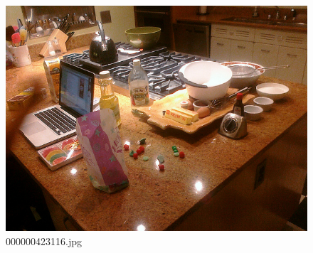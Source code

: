 \begin{figure}[h]
    \centering
    \includegraphics[width=0.8\linewidth]{../image set/hard/000000423116.jpg}
    \caption{000000423116.jpg}
\end{figure}
